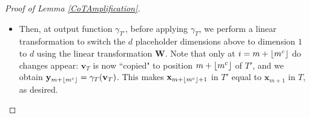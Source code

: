 \documentclass{article}
\theoremstyle{definition}
\DeclarePairedDelimiter{\floor}{\lfloor}{\rfloor}
\DeclareMathOperator*{\argmax}{arg\,max}
\newcommand{\x}{\mathbf{x}}
\newcommand{\q}{\mathbf{q}}
\renewcommand{\k}{\mathbf{k}}
\renewcommand{\v}{\mathbf{v}}
\newcommand{\y}{\mathbf{y}}
\newcommand{\W}{\mathbf{W}}
\newcommand{\0}{\mathbf{0}}
\newcommand{\1}{\mathbbm{1}}
\begin{document}
\begin{proof}[Proof of Lemma \ref{CoTAmplification}]
\begin{itemize}[noitemsep, leftmargin=10pt, topsep=0pt]
\begin{itemize}[noitemsep, leftmargin=10pt, topsep=0pt]
            We just use \textit{2 additional dimensions}, one to line up $1$ for $\q_i$ and $\big(-\frac{1}{j}\big)$ for $\k_j$, and the other to line up  $\1(i = m + \floor{m^c})$ for $\q_i$ and $\1(j=m)$ for $\k_j$.

            Note that when average hardmax is applied: 
            \begin{equation*}
                \eta = \eta(i) :=\argmax_{j\,:\,j \leq i} (\q_i^T \k_j) = \begin{cases}
                    i &\text{if $i \neq m + \floor{m^c}$} \\
                    m &\text{if $i = m + \floor{m^c}$}.
                \end{cases}
            \end{equation*}
            We design $\W_v$ such that $\W_v$ copies dimensions $1$ to $d$ of $\x_\eta^{(L+1)}$ to some $d$ placeholder dimensions of $\x_i^{(L+2)}$.

            \textit{We need $d$ placeholder dimensions here.}

            \item Then, at output function $\gamma_{T'}$, before applying $\gamma_T$, we perform a linear transformation to switch the $d$ placeholder dimensions above to dimension $1$ to $d$ using the linear transformation $\W$. Note that only at $i = m + \floor{m^c}$ do changes appear: $\v_T$ is now ``copied" to position  $m+\floor{m^c}$ of $T'$, and we obtain $\y_{m+ \floor{m^c}} = \gamma_T(\v_T)$. This makes $\x_{m+\floor{m^c} + 1}$ in $T'$ equal to $\x_{m+1}$ in $T$, as desired.
        \end{itemize}


\end{itemize}
\end{proof}
\end{document}

